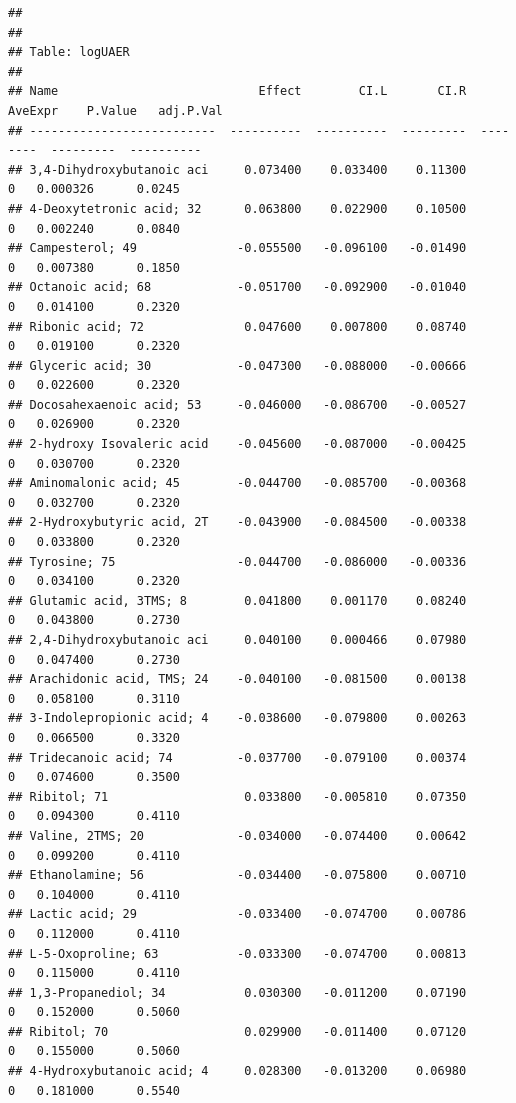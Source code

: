 \documentclass[]{article}
\begin{document}
\begin{verbatim}
## 
## 
## Table: logUAER
## 
## Name                            Effect        CI.L       CI.R   AveExpr    P.Value   adj.P.Val
## --------------------------  ----------  ----------  ---------  --------  ---------  ----------
## 3,4-Dihydroxybutanoic aci     0.073400    0.033400    0.11300         0   0.000326      0.0245
## 4-Deoxytetronic acid; 32      0.063800    0.022900    0.10500         0   0.002240      0.0840
## Campesterol; 49              -0.055500   -0.096100   -0.01490         0   0.007380      0.1850
## Octanoic acid; 68            -0.051700   -0.092900   -0.01040         0   0.014100      0.2320
## Ribonic acid; 72              0.047600    0.007800    0.08740         0   0.019100      0.2320
## Glyceric acid; 30            -0.047300   -0.088000   -0.00666         0   0.022600      0.2320
## Docosahexaenoic acid; 53     -0.046000   -0.086700   -0.00527         0   0.026900      0.2320
## 2-hydroxy Isovaleric acid    -0.045600   -0.087000   -0.00425         0   0.030700      0.2320
## Aminomalonic acid; 45        -0.044700   -0.085700   -0.00368         0   0.032700      0.2320
## 2-Hydroxybutyric acid, 2T    -0.043900   -0.084500   -0.00338         0   0.033800      0.2320
## Tyrosine; 75                 -0.044700   -0.086000   -0.00336         0   0.034100      0.2320
## Glutamic acid, 3TMS; 8        0.041800    0.001170    0.08240         0   0.043800      0.2730
## 2,4-Dihydroxybutanoic aci     0.040100    0.000466    0.07980         0   0.047400      0.2730
## Arachidonic acid, TMS; 24    -0.040100   -0.081500    0.00138         0   0.058100      0.3110
## 3-Indolepropionic acid; 4    -0.038600   -0.079800    0.00263         0   0.066500      0.3320
## Tridecanoic acid; 74         -0.037700   -0.079100    0.00374         0   0.074600      0.3500
## Ribitol; 71                   0.033800   -0.005810    0.07350         0   0.094300      0.4110
## Valine, 2TMS; 20             -0.034000   -0.074400    0.00642         0   0.099200      0.4110
## Ethanolamine; 56             -0.034400   -0.075800    0.00710         0   0.104000      0.4110
## Lactic acid; 29              -0.033400   -0.074700    0.00786         0   0.112000      0.4110
## L-5-Oxoproline; 63           -0.033300   -0.074700    0.00813         0   0.115000      0.4110
## 1,3-Propanediol; 34           0.030300   -0.011200    0.07190         0   0.152000      0.5060
## Ribitol; 70                   0.029900   -0.011400    0.07120         0   0.155000      0.5060
## 4-Hydroxybutanoic acid; 4     0.028300   -0.013200    0.06980         0   0.181000      0.5540

\end{verbatim}
\end{document}
